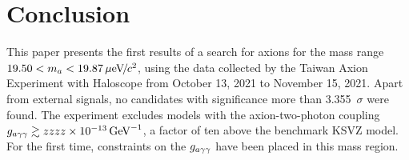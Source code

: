 
\section{Conclusion} 
This paper presents the first results of a search for axions for the mass 
range $19.50 < m_a < 19.87 \,\mu\text{e\hspace{-.08em}V\hspace{-0.16em}/\hspace{-0.08em}}c^2$, using the data collected by the Taiwan 
Axion Experiment with Haloscope from October 13, 2021 to November 15, 2021. 
Apart from external signals, no candidates with significance more than
3.355~$\sigma$ were found. The experiment excludes models with the axion-two-photon
coupling $g_{a\gamma\gamma}\gtrsim zzzz\times 10^{-13}\,\text{Ge\hspace{-.08em}V}^{-1}$, a factor of ten above the benchmark
KSVZ model. For the first time, 
constraints on the $g_{a\gamma\gamma}$ have been placed in this mass region.

